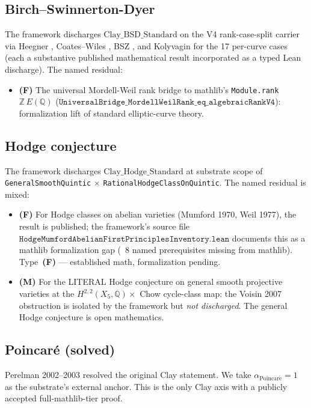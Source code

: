 \documentclass[11pt,a4paper,reqno]{amsart}
\theoremstyle{plain}
\theoremstyle{definition}
\theoremstyle{remark}
\newcommand{\aPo}{\alpha_{\mathrm{Poincar\acute{e}}}}
\newcommand{\Cstd}[1]{\mathrm{Clay\_#1\_Standard}}
\newcommand{\code}[1]{\texttt{#1}}
\begin{document}
\subsection{Birch--Swinnerton-Dyer}
The framework discharges $\Cstd{BSD}$ on the V4 rank-case-split
carrier via Heegner \cite{heegner1952}, Coates--Wiles
\cite{coates1977kummer}, BSZ \cite{birch1965notes,
swinnerton1965conjectures}, and Kolyvagin \cite{kolyvagin1988} for the
17 per-curve cases (each a substantive published mathematical result
incorporated as a typed Lean discharge). The named residual:
\begin{itemize}
\item \textbf{(F)} The universal Mordell-Weil rank bridge to mathlib's
  \code{Module.rank} $\mathbb{Z}\, E(\mathbb{Q})$
  ($\code{UniversalBridge\_MordellWeilRank\_eq\_algebraicRankV4}$):
  formalization lift of standard elliptic-curve theory.
\end{itemize}

\subsection{Hodge conjecture}
The framework discharges $\Cstd{Hodge}$ at substrate scope of
\code{GeneralSmoothQuintic} $\times$ \code{RationalHodgeClassOnQuintic}.
The named residual is mixed:
\begin{itemize}
\item \textbf{(F)} For Hodge classes on abelian varieties (Mumford 1970,
  Weil 1977), the result is published; the framework's source file
  $\code{HodgeMumfordAbelianFirstPrinciplesInventory.lean}$ documents
  this as a mathlib formalization gap (~$8$ named prerequisites
  missing from mathlib). Type~\textbf{(F)} — established math,
  formalization pending.
\item \textbf{(M)} For the LITERAL Hodge conjecture on general smooth
  projective varieties at the $H^{2,2}(X_{5}, \mathbb{Q}) \times$ Chow
  cycle-class map: the Voisin 2007 \cite{voisin2007hodge} obstruction
  is isolated by the framework but \emph{not discharged}. The general
  Hodge conjecture is open mathematics.
\end{itemize}

\subsection{Poincar\'e (solved)}
Perelman 2002--2003 \cite{perelman2002entropy, perelman2003ricci,
perelman2003finite} resolved the original Clay statement. We take
$\aPo = 1$ as the substrate's external anchor. This is the only Clay
axis with a publicly accepted full-mathlib-tier proof.
\end{document}
